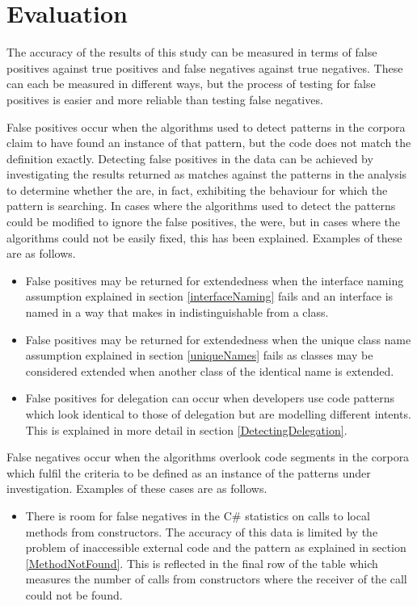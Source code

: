 \section{Evaluation}
The accuracy of the results of this study can be measured in terms of false positives against true positives and false negatives against true negatives. These can each be measured in different ways, but the process of testing for false positives is easier and more reliable than testing false negatives.
\newline

False positives occur when the algorithms used to detect patterns in the corpora claim to have found an instance of that pattern, but the code does not match the definition exactly. Detecting false positives in the data can be achieved by investigating the results returned as matches against the patterns in the analysis to determine whether the are, in fact, exhibiting the behaviour for which the pattern is searching. In cases where the algorithms used to detect the patterns could be modified to ignore the false positives, the were, but in cases where the algorithms could not be easily fixed, this has been explained. Examples of these are as follows.
\begin{itemize}
	\item False positives may be returned for extendedness when the interface naming assumption explained in section \ref{interfaceNaming} fails and an interface is named in a way that makes in indistinguishable from a class.
	\item False positives may be returned for extendedness when the unique class name assumption explained in section \ref{uniqueNames} fails as classes may be considered extended when another class of the identical name is extended.
	\item False positives for delegation can occur when developers use code patterns which look identical to those of delegation but are modelling different intents. This is explained in more detail in section \ref{DetectingDelegation}.
	\newline
\end{itemize} 

False negatives occur when the algorithms overlook code segments in the corpora which fulfil the criteria to be defined as an instance of the patterns under investigation. Examples of these cases are as follows.
\begin{itemize}
	\item There is room for false negatives in the C\# statistics on calls to local methods from constructors. The accuracy of this data is limited by the problem of inaccessible external code and the  pattern as explained in section \ref{MethodNotFound}. This is reflected in the final row of the table which measures the number of calls from constructors where the receiver of the call could not be found.
\end{itemize}








